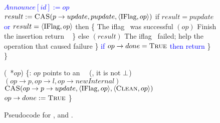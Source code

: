\begin{figure*}
\begin{code}
		\textcolor{blue}{$Announce[id] := op$} \nlc
		$result := \mbox{\sc CAS}(p\rightarrow update, pupdate, \langle \mbox{IFlag}, op\rangle)$ \label{iflag-cas} \nlc
		if $result = pupdate$ \textcolor{blue}{or $result = \langle \mbox{IFlag},op \rangle$} then \{ \tabtabcom The iflag \CASB\ was successful\nlc
		\n            {}$(op)$ \tabtabcom Finish the insertion\label{finish-insert}\nlc
		return \TRUE\ \label{insert-true}\nlc
		\p        \}\nlc 
		else $(result)$ \tabcom The iflag \CASB\ failed; help the operation that caused failure\label{ins-help-after-failure}\nlc
		\p    \}\nlc
		\textcolor{blue}{if $op \rightarrow done = \mbox{\sc True}$ then} \nlc
		\n		\textcolor{blue}{return \TRUE} \nlc \p
		\p\}\nlc 
		\p
		\}\bl
		\nlc
		
		(\IFlag\ *$op$) \{\ul
		\n     {}:  $op$ points to an \IFlag\ \record\  (\ie, it is not $\mbox{$\bot$}$)\nlc
		$(op\rightarrow p, op\rightarrow l, op\rightarrow newInternal)$ \label{ichild-cas}\nlc
		$\mbox{\sc CAS}(op\rightarrow p\rightarrow update, \langle \mbox{IFlag}, op \rangle, \langle \mbox{\sc Clean}, op\rangle)$  \label{iunflag-cas}\nlc
		\textcolor{blue}{$op \rightarrow done := \mbox{\sc True}$} \nlc 
		\p
		\}
	\end{code}
	\caption{\label{code2}Pseudocode for ,  and .}
\end{figure*}

